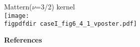 \documentclass[portrait,a1,final]{a0poster} %
\def\figpdfdir{fig/} %
\begin{document}
\begin{minipage}{1\linewidth}
\begin{minipage}[t]{0.48\textwidth}
\begin{minipage}[t]{0.49\textwidth}
\begin{minipage}[t]{0.45\textwidth}
\end{minipage}
\begin{minipage}[t]{0.50\textwidth}
\vspace{-0.5cm}
\hspace{0.25\textwidth}  {\tiny Mattern($\nu$=3/2) kernel}\\
\texttt{[image: \\figpdfdir caseI\_fig6\_4\_1\_vposter.pdf]}

\end{minipage}

\end{minipage}

\vspace*{3mm}
{\centering\textbf{References}}
\renewcommand{\bibsection}{}
{\tiny %


} %


\end{minipage} %
\hspace{0.02\linewidth} 
\end{minipage} %


%



\end{document}
